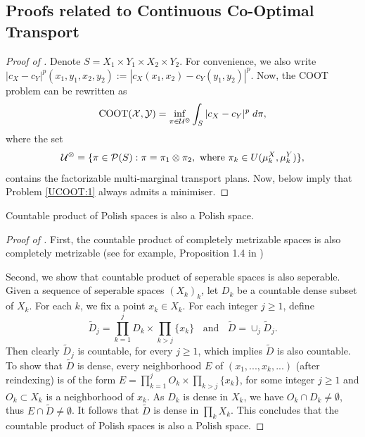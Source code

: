 \subsection{Proofs related to Continuous Co-Optimal Transport} \label{annex:cont_coot}

\begin{proof}[Proof of ]
  Denote $S = X_1 \times Y_1 \times X_2 \times Y_2$.
  For convenience, we also write
  $|c_X - c_Y|^p(x_1, y_1, x_2, y_2) := |c_X(x_1, x_2) - c_Y(y_1, y_2) |^p$.
  Now, the COOT problem can be rewritten as
  \begin{equation} \label{UCOOT:1}
    \text{COOT}(\mathcal X, \mathcal Y) = \inf_{\pi \in \mathcal U^{\otimes}} \int_{S} \vert c_X - c_Y \vert^p \; d\pi,
  \end{equation}
  where the set
  \begin{equation}
    \mathcal U^{\otimes} = \{ \pi \in \mathcal P(S): \pi = \pi_1 \otimes \pi_2,
    \text{ where } \pi_k \in U(\mu_k^X, \mu_k^Y) \},
  \end{equation}
  contains the factorizable multi-marginal transport plans.
  Now, 
  below imply that Problem \eqref{UCOOT:1} always admits a minimiser.
\end{proof}
\begin{lemma} \label{lemma:product_polish}
  Countable product of Polish spaces is also a Polish space.
\end{lemma}
\begin{proof}[Proof of ]
  First, the countable product of completely metrizable spaces is also completely metrizable
  (see for example, Proposition 1.4 in \citep{Dominique20})

  Second, we show that countable product of seperable spaces is also seperable.
  Given a sequence of seperable spaces $(X_k)_k$,
  let $D_k$ be a countable dense subset of $X_k$. For each $k$,
  we fix a point $x_k \in X_k$. For each integer $j \geq 1$, define
  \begin{equation}
    \widetilde{D}_j = \prod_{k=1}^j D_k \times \prod_{k > j} \{ x_k \}
    \;\; \text{ and } \;\;
    \widetilde{D} = \cup_{j} \widetilde{D}_j.
  \end{equation}
  Then clearly $\widetilde{D}_j$ is countable, for every $j \geq 1$,
  which implies $\widetilde{D}$ is also countable.
  To show that $\widetilde{D}$ is dense, every neighborhood $E$ of
  $(x_1, ..., x_k, ...)$ (after reindexing) is of the form
  $E = \prod_{k=1}^j O_k \times \prod_{k > j} \{ x_k \}$,
  for some integer $j \geq 1$ and $O_k \subset X_k$ is a neighborhood of $x_k$.
  As $D_k$ is dense in $X_k$, we have $O_k \cap D_k \neq \emptyset$,
  thus $E \cap \widetilde{D} \neq \emptyset$.
  It follows that $\widetilde{D}$ is dense in $\prod_k X_k$.
  This concludes that the countable product of Polish spaces is also a Polish space.
\end{proof}
